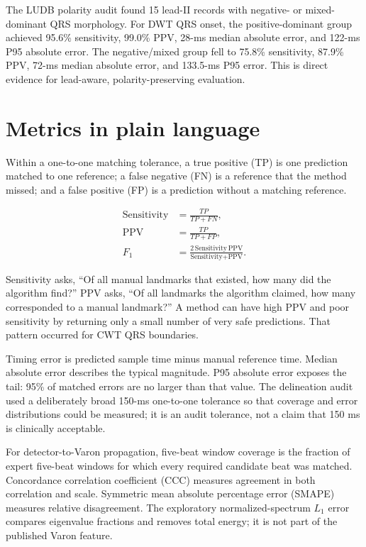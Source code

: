 \documentclass[11pt,a4paper]{article}
\begin{document}
The LUDB polarity audit found 15 lead-II records with negative- or mixed-dominant QRS morphology. For DWT QRS onset, the positive-dominant group achieved 95.6\% sensitivity, 99.0\% PPV, 28-ms median absolute error, and 122-ms P95 absolute error. The negative/mixed group fell to 75.8\% sensitivity, 87.9\% PPV, 72-ms median absolute error, and 133.5-ms P95 error. This is direct evidence for lead-aware, polarity-preserving evaluation.

\section{Metrics in plain language}
\label{sec:metrics}

Within a one-to-one matching tolerance, a true positive (TP) is one prediction matched to one reference; a false negative (FN) is a reference that the method missed; and a false positive (FP) is a prediction without a matching reference.

\begin{align}
\text{Sensitivity} &= \frac{TP}{TP+FN},\\
\text{PPV} &= \frac{TP}{TP+FP},\\
F_1 &= \frac{2\,\text{Sensitivity}\,\text{PPV}}
{\text{Sensitivity}+\text{PPV}}.
\end{align}

Sensitivity asks, ``Of all manual landmarks that existed, how many did the algorithm find?'' PPV asks, ``Of all landmarks the algorithm claimed, how many corresponded to a manual landmark?'' A method can have high PPV and poor sensitivity by returning only a small number of very safe predictions. That pattern occurred for CWT QRS boundaries.

Timing error is predicted sample time minus manual reference time. Median absolute error describes the typical magnitude. P95 absolute error exposes the tail: 95\% of matched errors are no larger than that value. The delineation audit used a deliberately broad 150-ms one-to-one tolerance so that coverage and error distributions could be measured; it is an audit tolerance, not a claim that 150 ms is clinically acceptable.

For detector-to-Varon propagation, five-beat window coverage is the fraction of expert five-beat windows for which every required candidate beat was matched. Concordance correlation coefficient (CCC) measures agreement in both correlation and scale. Symmetric mean absolute percentage error (SMAPE) measures relative disagreement. The exploratory normalized-spectrum $L_1$ error compares eigenvalue fractions and removes total energy; it is not part of the published Varon feature.
\end{document}

